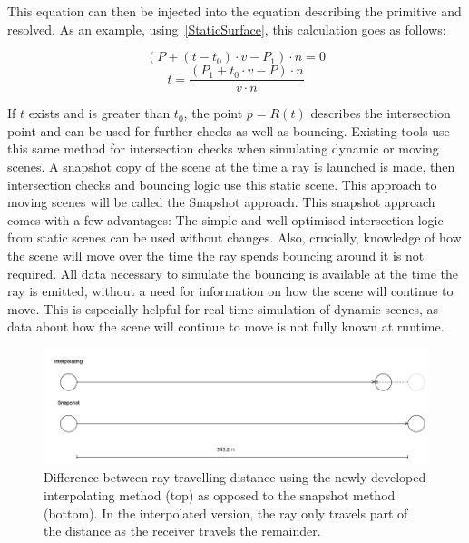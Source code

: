 This equation can then be injected into the equation describing the primitive and resolved.
As an example, using~\eqref{StaticSurface}, this calculation goes as follows:

\begin{equation*}
    (P + (t - t_0) \cdot v - P_1) \cdot n = 0
\end{equation*}
\begin{equation}\label{StaticSurfaceIntersect}
    t = \frac{(P_1 + t_0 \cdot v - P) \cdot n}{v \cdot n}
\end{equation}

If \(t\) exists and is greater than \(t_0\),
the point \(p = R(t)\) describes the intersection point and can be used for further checks
as well as bouncing.
\newline
Existing tools use this same method for intersection checks when simulating dynamic or moving scenes.
A snapshot copy of the scene at the time a ray is launched is made,
then intersection checks and bouncing logic use this static scene.
This approach to moving scenes will be called the Snapshot approach.
\newline
This snapshot approach comes with a few advantages:
The simple and well-optimised intersection logic from static scenes can be used without changes.
Also, crucially, knowledge of how the scene will move over the time the ray spends bouncing around it is not required.
All data necessary to simulate the bouncing is available at the time the ray is emitted,
without a need for information on how the scene will continue to move.
This is especially helpful for real-time simulation of dynamic scenes, as data about how the scene will continue to move is not
fully known at runtime.
\newline
\begin{figure}\label{im:SnapshotExplain}
    \includegraphics[width=\linewidth]{images/snapshot_explain.jpg}
    \caption{Difference between ray travelling distance using the newly developed interpolating method (top) as opposed to the snapshot method (bottom). In the interpolated version, the ray only travels part of the distance as the receiver travels the remainder.}
\end{figure}
